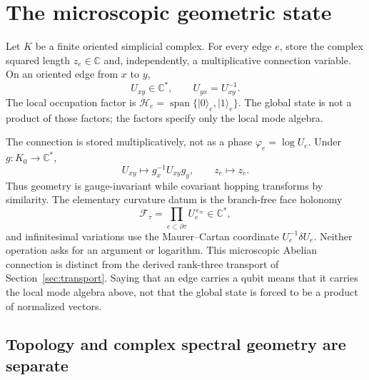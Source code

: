 \documentclass[11pt,letterpaper]{article}
\newcommand{\HK}{\mathcal{H}}
\begin{document}
\section{The microscopic geometric state}\label{sec:state}

Let $K$ be a finite oriented simplicial complex. For every edge $e$, store
the complex squared length $z_e\in\mathbb C$ and, independently, a
multiplicative connection variable. On an oriented edge from $x$ to $y$,
\begin{equation*}
  U_{xy}\in\mathbb C^{*},\qquad U_{yx}=U_{xy}^{-1}.
\end{equation*}
The local occupation factor is
$\HK_e=\operatorname{span}\{\lvert0\rangle_e,\lvert1\rangle_e\}$. The global
state is not a product of those factors; the factors specify only the local
mode algebra.

The connection is stored multiplicatively, not as a phase
$\varphi_e=\log U_e$. Under $g:K_0\to\mathbb C^{*}$,
\begin{equation*}
  U_{xy}\longmapsto g_x^{-1}U_{xy}g_y ,
  \qquad z_e\longmapsto z_e .
\end{equation*}
Thus geometry is gauge-invariant while covariant hopping transforms by
similarity. The elementary curvature datum is the branch-free face holonomy
\begin{equation*}
  \mathcal F_\tau
  =\prod_{e\subset\partial\tau}U_e^{\,\epsilon_{\tau e}}\in\mathbb C^{*},
\end{equation*}
and infinitesimal variations use the Maurer--Cartan coordinate
$U_e^{-1}\delta U_e$. Neither operation asks for an argument or logarithm.
This microscopic Abelian connection is distinct from the derived rank-three
transport of Section~\ref{sec:transport}. Saying that an edge carries a qubit
means that it carries the local mode algebra above, not that the global state
is forced to be a product of normalized vectors.

\subsection{Topology and complex spectral geometry are separate}
\end{document}
